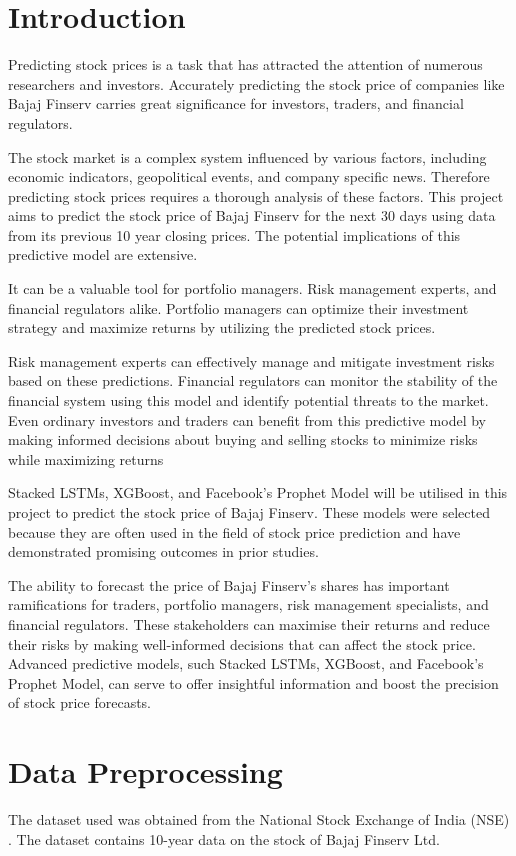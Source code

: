\documentclass[12pt]{article}
\begin{document}
\section{Introduction}
\normalsize{Predicting stock prices is a task that has attracted the attention of numerous researchers and investors. Accurately predicting the stock price of companies like Bajaj Finserv carries great significance for investors, traders, and financial regulators. 

The stock market is a complex system influenced by various factors, including economic indicators, geopolitical events, and company specific news. Therefore predicting stock prices requires a thorough analysis of these factors. This project aims to predict the stock price of Bajaj Finserv for the next 30 days using data from its previous 10 year closing prices. The potential implications of this predictive model are extensive. 

It can be a valuable tool for portfolio managers. Risk management experts, and financial regulators alike. Portfolio managers can optimize their investment strategy and maximize returns by utilizing the predicted stock prices. 

Risk management experts can effectively manage and mitigate investment risks based on these predictions. Financial regulators can monitor the stability of the financial system using this model and identify potential threats to the market. Even ordinary investors and traders can benefit from this predictive model by making informed decisions about buying and selling stocks to minimize risks while maximizing returns

Stacked LSTMs, XGBoost, and Facebook's Prophet Model will be utilised in this project to predict the stock price of Bajaj Finserv. These models were selected because they are often used in the field of stock price prediction and have demonstrated promising outcomes in prior studies.

The ability to forecast the price of Bajaj Finserv's shares has important ramifications for traders, portfolio managers, risk management specialists, and financial regulators. These stakeholders can maximise their returns and reduce their risks by making well-informed decisions that can affect the stock price. Advanced predictive models, such Stacked LSTMs, XGBoost, and Facebook's Prophet Model, can serve to offer insightful information and boost the precision of stock price forecasts.
}
\section{Data Preprocessing}
\vspace{0in}
\normalsize{The dataset used was obtained from the National Stock Exchange of India (NSE) \cite{nseindia}. The dataset contains 10-year data on the stock of Bajaj Finserv Ltd.} 
\end{document}
